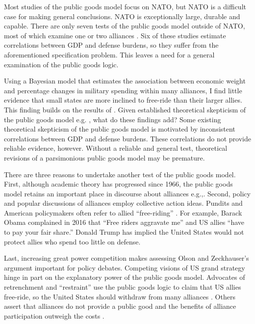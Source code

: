 \documentclass[12pt]{article}
\begin{document}
Most studies of the public goods model focus on NATO, but NATO is a difficult case for making general conclusions. 
NATO is exceptionally large, durable and capable. 
There are only seven tests of the public goods model outside of NATO, most of which examine one or two alliances \citep{Russett1970, Starr1974, Reisinger1983, Thies1987, ConybeareSandler1990, OnealWhatley1996, Siroky2012}. 
Six of these studies estimate correlations between GDP and defense burdens, so they suffer from the aforementioned specification problem.
This leaves a need for a general examination of the public goods logic. 


Using a Bayesian model that estimates the association between economic weight and percentage changes in military spending within many alliances, I find little evidence that small states are more inclined to free-ride than their larger allies.
This finding builds on the results of \citep{PluemperNeumayer2015}.
Given established theoretical skepticism of the public goods model e.g. \citep{Palmer1990, GatesTerasawa1992, SandlerHartley2001, Norrlof2010, NiouZeigler2019}, what do these findings add? 
Some existing theoretical skepticism of the public goods model is motivated by inconsistent correlations between GDP and defense burdens. 
These correlations do not provide reliable evidence, however. 
Without a reliable and general test, theoretical revisions of a parsimonious public goods model may be premature.


There are three reasons to undertake another test of the public goods model. 
First, although academic theory has progressed since 1966, the public goods model retains an important place in discourse about alliances e.g.,\citep{Walt1990, Sandler1993, Mearsheimer1994, Goldstein1995, SandlerHartley2001, Garfinkel2004, Walt2009, Norrlof2010, Barrett2010, PluemperNeumayer2015}.
Second, policy and popular discussions of alliances employ collective action ideas.
Pundits and American policymakers often refer to allied ``free-riding'' \citep{Lanoszka2015}.   
For example, Barack Obama complained in 2016 that ``Free riders aggravate me'' and US allies ``have to pay your fair share.'' 
Donald Trump has implied the United States would not protect allies who spend too little on defense. 


Last, increasing great power competition makes assessing Olson and Zeckhauser's argument important for policy debates. 
Competing visions of US grand strategy hinge in part on the explanatory power of the public goods model. 
Advocates of retrenchment and ``restraint'' use the public goods logic to claim that US allies free-ride, so the United States should withdraw from many alliances \citep{Preble2009, Posen2014}. 
Others assert that alliances do not provide a public good and the benefits of alliance participation outweigh the costs \citep{Brooksetal2013, BrandsFeaver2017}. 
\end{document}
